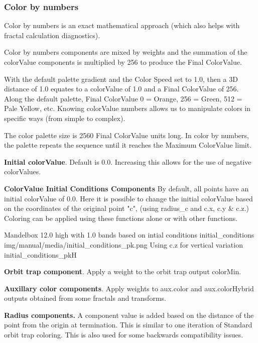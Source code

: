 \subsubsection{Color by numbers}\label{materials-color-by-numbers}

Color by numbers is an exact mathematical approach (which also helps with fractal calculation diagnostics).

Color by numbers components are mixed by weights and the summation of the colorValue components is multiplied by 256 to produce the Final ColorValue.

With the default palette gradient and the Color Speed set to 1.0, then a 3D distance of 1.0 equates to a colorValue of 1.0 and a Final ColorValue of 256. Along the default palette, Final ColorValue 0 = Orange, 256 = Green, 512 = Pale Yellow, etc.
Knowing colorValue numbers allows us to manipulate colors in specific ways (from simple to complex).

The color palette size is 2560 Final ColorValue units long. In color by numbers, the palette repeats the sequence until it reaches the Maximum ColorValue limit.

\textbf{Initial colorValue}. Default is 0.0. Increasing this allows for the use of negative colorValues.

\textbf{ColorValue Initial Conditions Components}
By default, all points have an initial colorValue of 0.0. Here it is possible to change the initial colorValue based on the coordinates of the original point "c", (using radius\_c and c.x, c.y \& c.z.) Coloring can be applied using these functions alone or with other functions.

{Mandelbox 12.0 high with 1.0 bands based on intial conditions}
{initial_conditions}
{img/manual/media/initial_conditions_pk.png}
{Using c.z for vertical variation}
{initial_conditions_pk}{H}

\textbf{Orbit trap component}. Apply a weight to the orbit trap output colorMin.

\textbf{Auxillary color components}. Apply weights to aux.color and aux.colorHybrid outputs obtained from some fractals and transforms.

\textbf{Radius components.} A component value is added based on the distance of the point from the origin at termination.
This is similar to one iteration of Standard orbit trap coloring. This is also used for some backwards compatibility issues.

